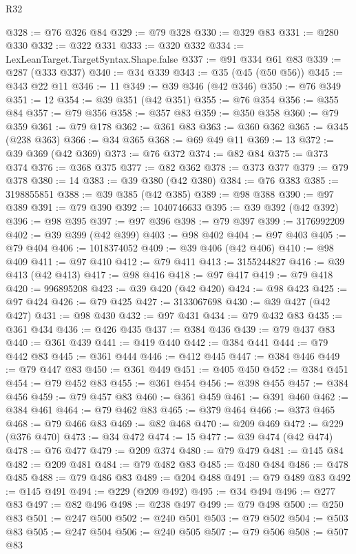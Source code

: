 \begin{lexlean}{R32}
\begin{coremodule}
@328 := @76 @326 @84
@329 := @79 @328
@330 := @329 @83
@331 := @280 @330
@332 := @322 @331
@333 := @320 @332
@334 := LexLeanTarget.TargetSyntax.Shape.false
@337 := @91 @334 @61 @83
@339 := @287 (@333 @337)
@340 := @34 @339
@343 := @35 (@45 (@50 @56))
@345 := @343 @22 @11
@346 := 11
@349 := @39 @346 (@42 @346)
@350 := @76 @349
@351 := 12
@354 := @39 @351 (@42 @351)
@355 := @76 @354
@356 := @355 @84
@357 := @79 @356
@358 := @357 @83
@359 := @350 @358
@360 := @79 @359
@361 := @79 @178
@362 := @361 @83
@363 := @360 @362
@365 := @345 (@238 @363)
@366 := @34 @365
@368 := @69 @49 @11
@369 := 13
@372 := @39 @369 (@42 @369)
@373 := @76 @372
@374 := @82 @84
@375 := @373 @374
@376 := @368 @375
@377 := @82 @362
@378 := @373 @377
@379 := @79 @378
@380 := 14
@383 := @39 @380 (@42 @380)
@384 := @76 @383
@385 := 3198855851
@388 := @39 @385 (@42 @385)
@389 := @98 @388
@390 := @97 @389
@391 := @79 @390
@392 := 1040746633
@395 := @39 @392 (@42 @392)
@396 := @98 @395
@397 := @97 @396
@398 := @79 @397
@399 := 3176992209
@402 := @39 @399 (@42 @399)
@403 := @98 @402
@404 := @97 @403
@405 := @79 @404
@406 := 1018374052
@409 := @39 @406 (@42 @406)
@410 := @98 @409
@411 := @97 @410
@412 := @79 @411
@413 := 3155244827
@416 := @39 @413 (@42 @413)
@417 := @98 @416
@418 := @97 @417
@419 := @79 @418
@420 := 996895208
@423 := @39 @420 (@42 @420)
@424 := @98 @423
@425 := @97 @424
@426 := @79 @425
@427 := 3133067698
@430 := @39 @427 (@42 @427)
@431 := @98 @430
@432 := @97 @431
@434 := @79 @432 @83
@435 := @361 @434
@436 := @426 @435
@437 := @384 @436
@439 := @79 @437 @83
@440 := @361 @439
@441 := @419 @440
@442 := @384 @441
@444 := @79 @442 @83
@445 := @361 @444
@446 := @412 @445
@447 := @384 @446
@449 := @79 @447 @83
@450 := @361 @449
@451 := @405 @450
@452 := @384 @451
@454 := @79 @452 @83
@455 := @361 @454
@456 := @398 @455
@457 := @384 @456
@459 := @79 @457 @83
@460 := @361 @459
@461 := @391 @460
@462 := @384 @461
@464 := @79 @462 @83
@465 := @379 @464
@466 := @373 @465
@468 := @79 @466 @83
@469 := @82 @468
@470 := @209 @469
@472 := @229 (@376 @470)
@473 := @34 @472
@474 := 15
@477 := @39 @474 (@42 @474)
@478 := @76 @477
@479 := @209 @374
@480 := @79 @479
@481 := @145 @84
@482 := @209 @481
@484 := @79 @482 @83
@485 := @480 @484
@486 := @478 @485
@488 := @79 @486 @83
@489 := @204 @488
@491 := @79 @489 @83
@492 := @145 @491
@494 := @229 (@209 @492)
@495 := @34 @494
@496 := @277 @83
@497 := @82 @496
@498 := @238 @497
@499 := @79 @498
@500 := @250 @83
@501 := @247 @500
@502 := @240 @501
@503 := @79 @502
@504 := @503 @83
@505 := @247 @504
@506 := @240 @505
@507 := @79 @506
@508 := @507 @83

\end{coremodule}
\end{lexlean}
